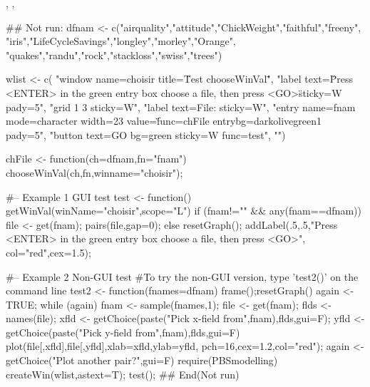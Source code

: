 \documentclass[letterpaper]{book}
\begin{document}
\begin{SeeAlso}\relax
{}, , 
\end{SeeAlso}
\begin{Examples}
\begin{ExampleCode}
## Not run: 
dfnam <-
        c("airquality","attitude","ChickWeight","faithful","freeny",
        "iris","LifeCycleSavings","longley","morley","Orange",
        "quakes","randu","rock","stackloss","swiss","trees")

wlist <- c(
        "window name=choisir title=\"Test chooseWinVal\"",
        "label text=\"Press <ENTER> in the green entry box
        \nto choose a file, then press <GO>\" sticky=W pady=5",
        "grid 1 3 sticky=W",
        "label text=File: sticky=W",
        "entry name=fnam mode=character width=23 value=\"\" 
        func=chFile entrybg=darkolivegreen1 pady=5",
        "button text=GO bg=green sticky=W func=test",
        "")

chFile <- function(ch=dfnam,fn="fnam") 
        {chooseWinVal(ch,fn,winname="choisir")};

#-- Example 1 GUI test
test <- function() {
        getWinVal(winName="choisir",scope="L")
        if (fnam!="" && any(fnam==dfnam)) {
                file <- get(fnam);
                pairs(file,gap=0); }
        else {
                resetGraph(); 
                addLabel(.5,.5,"Press <ENTER> in the green entry box
                \nto choose a file, then press <GO>", col="red",cex=1.5)}};

#-- Example 2 Non-GUI test
#To try the non-GUI version, type 'test2()' on the command line
test2 <- function(fnames=dfnam) {
  frame();resetGraph()
  again <- TRUE;
  while (again) {
    fnam <- sample(fnames,1); file <- get(fnam); 
    flds <- names(file);
    xfld <- getChoice(paste("Pick x-field from",fnam),flds,gui=F);
    yfld <- getChoice(paste("Pick y-field from",fnam),flds,gui=F)
    plot(file[,xfld],file[,yfld],xlab=xfld,ylab=yfld,
      pch=16,cex=1.2,col="red");
    again <- getChoice("Plot another pair?",gui=F) }
  }
require(PBSmodelling)
createWin(wlist,astext=T); test();
## End(Not run)
\end{ExampleCode}
\end{Examples}
\end{document}
